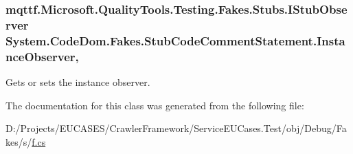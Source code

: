 \hypertarget{class_system_1_1_code_dom_1_1_fakes_1_1_stub_code_comment_statement_a379f7f98b47948bdb2f8f0cb0524e29f}{
\subsubsection[{Instance\-Observer}]{\setlength{\rightskip}{0pt plus 5cm}mqttf.\-Microsoft.\-Quality\-Tools.\-Testing.\-Fakes.\-Stubs.\-I\-Stub\-Observer System.\-Code\-Dom.\-Fakes.\-Stub\-Code\-Comment\-Statement.\-Instance\-Observer\hspace{0.3cm}{\ttfamily [get]}, {\ttfamily [set]}}}\label{class_system_1_1_code_dom_1_1_fakes_1_1_stub_code_comment_statement_a379f7f98b47948bdb2f8f0cb0524e29f}


Gets or sets the instance observer.



The documentation for this class was generated from the following file\-:\begin{DoxyCompactItemize}
\item 
D\-:/\-Projects/\-E\-U\-C\-A\-S\-E\-S/\-Crawler\-Framework/\-Service\-E\-U\-Cases.\-Test/obj/\-Debug/\-Fakes/s/\hyperlink{s_2f_8cs}{f.\-cs}\end{DoxyCompactItemize}
